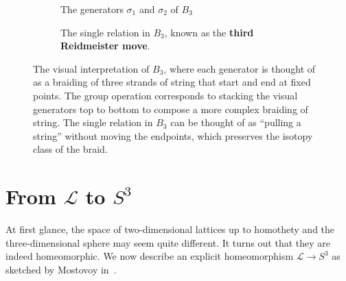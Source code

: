 \documentclass[12pt,twoside]{reedthesis}
\theoremstyle{definition}
\newcommand{\LS}{\mathcal{L}}
\begin{document}
\vspace{1em}
\begin{figure}[h]
  \centering
  \begin{subfigure}[t]{0.48\textwidth}
    \centering
    \hspace{10mm}
    \caption{The generators $\sigma_1$ and $\sigma_2$ of $B_3$}
  \end{subfigure}
  \hfill
  \begin{subfigure}[t]{0.48\textwidth}
    \centering
    \caption{The single relation in $B_3$, known as the \textbf{third Reidmeister move}.}
  \end{subfigure}
  \caption{The visual interpretation of $B_3$, where each generator is thought of as a braiding of three strands of string that start and end at fixed points. The group operation corresponds to stacking the visual generators top to bottom to compose a more complex braiding of string. The single relation in $B_3$ can be thought of as ``pulling a string'' without moving the endpoints, which preserves the isotopy class of the braid.}
  \label{fig:visual_braid_group}
\end{figure}

\section{From $\LS$ to $S^3$}\label{subsec:lattice_to_s3}

At first glance, the space of two-dimensional lattices up to homothety and the three-dimensional sphere may seem quite different.
It turns out that they are indeed homeomorphic.
We now describe an explicit homeomorphism $\LS \to S^3$ as sketched by Mostovoy in~\cite{mostovoy2004}.
\end{document}
